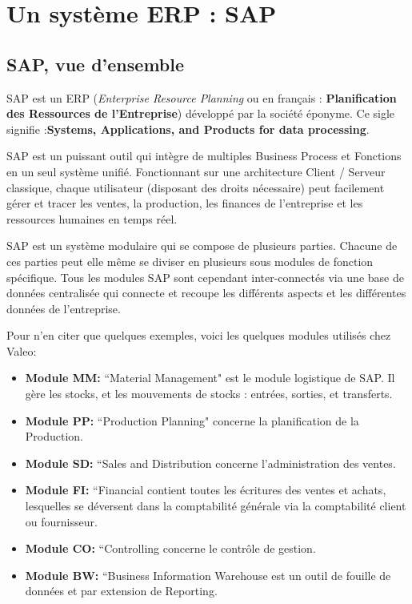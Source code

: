 \section{Un système ERP : SAP}

%

\subsection{SAP, vue d'ensemble}

SAP est un ERP (\emph{Enterprise Resource Planning} ou en français :  \textbf{Planification des Ressources de l'Entreprise}) développé par la société éponyme. Ce sigle signifie :\textbf{Systems, Applications, and Products for data processing}.

SAP est un puissant outil qui intègre de multiples Business Process et Fonctions en un seul système unifié. Fonctionnant sur une architecture Client / Serveur classique, chaque utilisateur (disposant des droits nécessaire) peut facilement gérer et tracer les ventes, la production, les finances de l'entreprise et les ressources humaines en temps réel. 

SAP est un système modulaire qui se compose de plusieurs parties. Chacune de ces parties peut elle même se diviser en plusieurs sous modules de fonction spécifique.
Tous les modules SAP sont cependant inter-connectés via une base de données centralisée qui connecte et recoupe les différents aspects et les différentes données de l'entreprise.

Pour n'en citer que quelques exemples, voici les quelques modules utilisés chez Valeo:

\begin{itemize}
	\item \textbf{Module MM: }``Material Management" est le module logistique de SAP. Il gère les stocks, et les mouvements de stocks : entrées, sorties, et transferts.
	
	\item \textbf{Module PP: }``Production Planning" concerne la planification de la Production.
	
	 \item \textbf{Module SD: }``Sales and Distribution concerne l'administration des ventes.
	 
	 \item \textbf{Module FI: }``Financial contient toutes les écritures des ventes et achats, lesquelles se déversent dans la comptabilité générale via la comptabilité client ou fournisseur.
	 
	 \item \textbf{Module CO: }``Controlling concerne le contrôle de gestion.
	 
	 \item \textbf{Module BW: }``Business Information Warehouse est un outil de fouille de données et par extension de Reporting.
	 
\end{itemize} 

